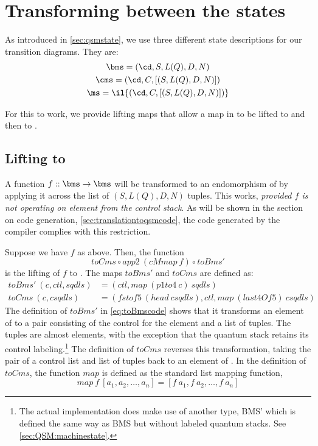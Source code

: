 
\section{Transforming between the states}\label{sec:statetransforming}



As introduced in \vref{sec:qsmstate}, we use three different 
state descriptions for our transition diagrams.
They are:
\begin{gather*}
\bms = (\cd,S,L(Q),D,N)\\
\cms = (\cd, C , [(S,L(Q),D,N)])\\
\ms = \il{(\cd, C , [(S,L(Q),D,N)])} 
\end{gather*}

For this to work, we provide lifting maps that allow a map in \bms{}
to be lifted to \cms{} and then to \ms{}.

\subsection{Lifting \bms{} to \cms}\label{subsec:liftbmstocms}


A function $f::\bms\to\bms$ will be transformed to an
endomorphism of \cms{} by applying it across 
the list of $(S,L(Q),D,N)$ tuples.
This works, 
\emph{provided $f$ is not operating on element from the control stack}. As 
will be shown in the section on code generation, 
\vref{sec:translationtoqsmcode},
the code generated by the \lqpl{} compiler complies with this restriction.

Suppose we have $f$ as above. Then, the function
\begin{equation}
toCms \circ app2\ (cMmap\ f) \circ toBms'\label{eq:liftingofbmsmap}
\end{equation}
is the  lifting of $f$ to \cms.
The  maps $toBms'$ and $toCms$ are defined as:
\begin{align}
  toBms'\ (c, ctl , sqdls) &= (ctl , 
map\ (p1to4\ c)\ sqdls)\label{eq:toBmscode}\\
  toCms\ (c, csqdls) &= (fstof5\ (head\ csqdls), ctl , 
map\ (last4Of5)\ csqdls)\label{eq:toCmscode}
\end{align}
The definition of $toBms'$ in \vref{eq:toBmscode} shows that it 
transforms an element of \cms{} to a pair consisting of the control
for the \cms{} element and a list of tuples. The tuples are almost
\bms{} elements, with the exception that the quantum stack retains its
control labeling.\footnote{The actual implementation does
make use of another type, BMS' which is defined the same way as BMS
but without labeled quantum stacks. See \vref{sec:QSM:machinestate}.}
The definition of $toCms$ reverses this transformation, taking the pair
of a control list and list of tuples back to an element of \cms.
In the definition of $toCms$, the
 function $map$ is defined as the standard list mapping function,
\begin{equation*}
map\ f\ [a_1,a_2,\ldots,a_n] = [f\ a_1,f\ a_2,\ldots,f\ a_n]
\end{equation*}

